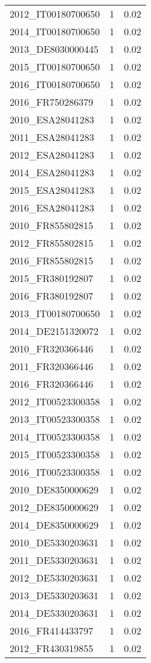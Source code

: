 \begin{table*}[htbp]
\begin{tabular}{lrr}
2012_IT00180700650 & 1 & 0.02 \\
2014_IT00180700650 & 1 & 0.02 \\
2013_DE8030000445 & 1 & 0.02 \\
2015_IT00180700650 & 1 & 0.02 \\
2016_IT00180700650 & 1 & 0.02 \\
2016_FR750286379 & 1 & 0.02 \\
2010_ESA28041283 & 1 & 0.02 \\
2011_ESA28041283 & 1 & 0.02 \\
2012_ESA28041283 & 1 & 0.02 \\
2014_ESA28041283 & 1 & 0.02 \\
2015_ESA28041283 & 1 & 0.02 \\
2016_ESA28041283 & 1 & 0.02 \\
2010_FR855802815 & 1 & 0.02 \\
2012_FR855802815 & 1 & 0.02 \\
2016_FR855802815 & 1 & 0.02 \\
2015_FR380192807 & 1 & 0.02 \\
2016_FR380192807 & 1 & 0.02 \\
2013_IT00180700650 & 1 & 0.02 \\
2014_DE2151320072 & 1 & 0.02 \\
2010_FR320366446 & 1 & 0.02 \\
2011_FR320366446 & 1 & 0.02 \\
2016_FR320366446 & 1 & 0.02 \\
2012_IT00523300358 & 1 & 0.02 \\
2013_IT00523300358 & 1 & 0.02 \\
2014_IT00523300358 & 1 & 0.02 \\
2015_IT00523300358 & 1 & 0.02 \\
2016_IT00523300358 & 1 & 0.02 \\
2010_DE8350000629 & 1 & 0.02 \\
2012_DE8350000629 & 1 & 0.02 \\
2014_DE8350000629 & 1 & 0.02 \\
2010_DE5330203631 & 1 & 0.02 \\
2011_DE5330203631 & 1 & 0.02 \\
2012_DE5330203631 & 1 & 0.02 \\
2013_DE5330203631 & 1 & 0.02 \\
2014_DE5330203631 & 1 & 0.02 \\
2016_FR414433797 & 1 & 0.02 \\
2012_FR430319855 & 1 & 0.02 \\

\end{tabular}
\end{table*}
